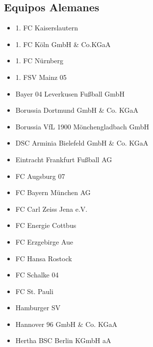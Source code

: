\subsection{Equipos Alemanes}\label{sec:equipos-ger}
\begin{multicols}{2}
	\begin{itemize}
	    \setlength{\itemsep}{1pt}
	    \setlength{\parskip}{0pt}
	    \setlength{\parsep}{0pt}

		\item 1. FC Kaiserslautern

		\item 1. FC Köln GmbH \& Co.KGaA

		\item 1. FC Nürnberg

		\item 1. FSV Mainz 05

		\item Bayer 04 Leverkusen Fußball GmbH

		\item Borussia Dortmund GmbH \& Co. KGaA

		\item Borussia VfL 1900 Mönchengladbach GmbH

		\item DSC Arminia Bielefeld GmbH \& Co. KGaA

		\item Eintracht Frankfurt Fußball AG

		\item FC Augsburg 07

		\item FC Bayern München AG

		\item FC Carl Zeiss Jena e.V.

		\item FC Energie Cottbus

		\item FC Erzgebirge Aue

		\item FC Hansa Rostock

		\item FC Schalke 04

		\item FC St. Pauli

		\item Hamburger SV

		\item Hannover 96 GmbH \& Co. KGaA

		\item Hertha BSC Berlin KGmbH aA


\end{itemize}
\end{multicols}
